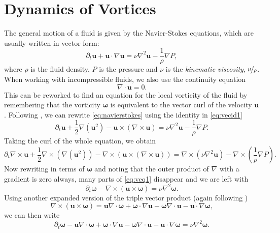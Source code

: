 \documentclass[10pt, a4paper]{article}
\numberwithin{equation}{section}
\newcommand{\vel}{\bm{u}}
\newcommand{\del}{\nabla}
\newcommand{\deldot}{\nabla \cdot}
\newcommand{\delcross}{\nabla \times}
\newcommand{\inv}[1]{\frac{1}{#1}}
\newcommand{\bo}{\bm{\omega}}
\begin{document}
\section{Dynamics of Vortices}
The general motion of a fluid is given by the Navier-Stokes equations, which are usually written in vector form:
\begin{equation}
\label{eq:navierstokes}
\partial_t\vel + \vel\cdot\del\vel = \nu \del^2 \vel -\inv{\rho} \del P,
\end{equation}
where $\rho$ is the fluid density, $P$ is the pressure and $\nu$ is the \emph{kinematic viscosity}, $\nicefrac{\mu}{\rho}$.
When working with incompressible fluids, we also use the continuity equation
\begin{equation}
\label{eq:cont}
\deldot \vel =0.
\end{equation}
This can be reworked to find an equation for the local vorticity of the fluid by remembering that the vorticity $\bo$ is equivalent to the vector curl of the velocity $\vel$.
Following \citet{harlen14c6}, we can rewrite \cref{eq:navierstokes} using the identity in \cref{eq:vecid1}
\begin{equation}
\label{eq:navs2}
\partial_t \vel + \inv{2}\del(\vel^2) - \vel\times (\delcross \vel) = \nu \del^2 \vel -\inv{\rho} \del P.
\end{equation}
Taking the curl of the whole equation, we obtain
\begin{equation}
\label{eq:veq1}
\partial_t \delcross\vel + \inv{2}\delcross(\del(\vel^2))-\delcross(\vel\times (\delcross \vel))=\delcross(\nu \del^2 \vel) -\delcross(\inv{\rho} \del P).
\end{equation}
Now rewriting in terms of $\bo$ and noting that the outer product of $\del$ with a gradient is zero always, many parts of \cref{eq:veq1} disappear and we are left with
\begin{equation}
\label{eq:veq2}
\partial_t \bo -\delcross(\vel\times\bo) = \nu \del^2 \bo.
\end{equation}
Using another expanded version of the triple vector product (again following \citet{harlen14c6})
\begin{equation}
\delcross(\vel \times \bo) = \vel\deldot\bo+\bo\cdot\del\vel -\bo\deldot\vel - \vel\cdot\del\bo,
\label{eq:vecid2}
\end{equation}
we can then write 
\begin{equation}
\partial_t \bo -  \vel\deldot\bo+\bo\cdot\del\vel -\bo\deldot\vel - \vel\cdot\del\bo = \nu \del^2 \bo.
\label{eq:veq3}
\end{equation}
\end{document}
